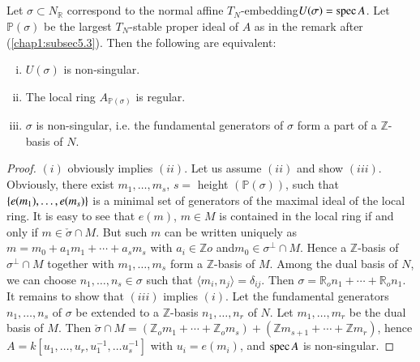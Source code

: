 \subsection{}\label{chap1:subsec5.6}%
  Let $\sigma \subset N_{\mathbb{R}}$ correspond to the normal
affine $T_N$-embedding\break $U(\sigma)= \operatorname{spec} A$. Let  $\mathbb{P}(\sigma)$
be the largest $T_N$-stable proper ideal of $A$ as in the remark after
(\ref{chap1:subsec5.3}). Then the following are equivalent: 
\begin{enumerate}[(i)]
\item $U(\sigma)$ is non-singular.

\item The local ring $A_{\mathbb{P}(\sigma)}$ is regular.

\item $\sigma$ is non-singular, i.e. the fundamental generators of
  $\sigma$ form a part of a $\mathbb{Z}$-basis of $N$.
\end{enumerate}

\begin{proof}
$(i)$ obviously implies $(ii)$. Let us assume $(ii)$ and show
  $(iii)$. Obviously, there exist $m_1,\ldots, m_s$, $s=$ height
  $(\mathbb{P}(\sigma))$, such that $\{ e(m_1) ,\ldots,\break e(m_s) \}$ is
  a minimal set of generators of the maximal ideal of the local
  ring. It is easy to see that $e(m)$, $m \in M$ is contained in the
  local ring if and only if $m \in \check{\sigma} \cap  M$. But such
  $m$ can be written uniquely as $m = m_0 + a_1 m_1 + \cdots + a_s
  m_s$ with $a_i \in \mathbb{Z}o$ and\pageoriginale $m_0 \in
  \sigma^{\perp} \cap 
  M$. Hence a $\mathbb{Z}$-basis of $\sigma^{\perp} \cap M$ together
  with $m_1, \ldots, m_s$ form a $\mathbb{Z}$-basis of $M$. Among the
  dual basis of $N$, we can choose $n_1 , \ldots , n_s \in \sigma$
  such that $\langle m_i ,n_j \rangle = \delta_{ij}$. Then $\sigma = \mathbb{R}_o
  n_1 + \cdots + \mathbb{R}_o n_1$. It remains to show that $(iii)$
  implies $(i)$. Let the fundamental generators $n_1 ,\ldots, n_s$ of
  $\sigma$ be extended to a $\mathbb{Z}$-basis $n_1 , \ldots , n_r$ of
  $N$. Let $m_1 , \ldots , m_r$ be the dual basis of $M$. Then
  $\check{\sigma} \cap M = (\mathbb{Z}_o m_1 + \cdots + \mathbb{Z}_o
  m_s) + (\mathbb{Z} m_{s+1} + \cdots + \mathbb{Z} m_r)$, hence $A= k[
    u_1, \ldots , u_r,u^{-1}_1,\ldots u^{-1}_s]$ with $u_i = e(m_i)$,
and $\operatorname{spec} A$ is non-singular. 
\end{proof}

